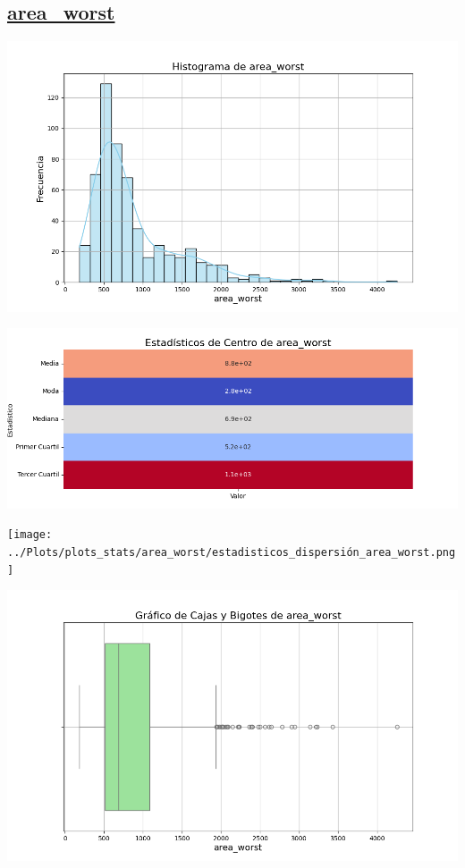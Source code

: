 \documentclass[a4paper, 12pt]{article}
\begin{document}
\subsection*{\underline{area\_worst}}

	\includegraphics[width=\textwidth]{../Plots/plots_stats/area_worst/histograma_area_worst.png}




\includegraphics[width=\textwidth]{../Plots/plots_stats/area_worst/estadisticas_centro_area_worst.png}




\texttt{[image: ../Plots/plots\_stats/area\_worst/estadisticos\_dispersión\_area\_worst.png]}



\includegraphics[width=\textwidth]{../Plots/plots_stats/area_worst/boxplot_area_worst.png}
\end{document}
